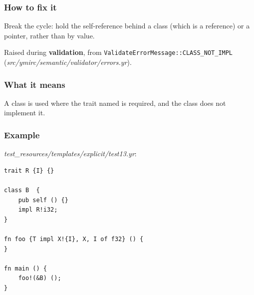 \subsubsection*{How to fix it}

Break the cycle: hold the self-reference behind a class (which is a reference) or a pointer, rather than by value.

\label{sec:codes:e4018}

Raised during \textbf{validation}, from \texttt{ValidateErrorMessage::\allowbreak{}CLASS\_\allowbreak{}NOT\_\allowbreak{}IMPL} (\textit{src/\allowbreak{}ymirc/\allowbreak{}semantic/\allowbreak{}validator/\allowbreak{}errors.yr}).

\subsubsection*{What it means}

A class is used where the trait named is required, and the class does not implement it.

\subsubsection*{Example}

\textit{test\_\allowbreak{}resources/\allowbreak{}templates/\allowbreak{}explicit/\allowbreak{}test13.yr}:

\begin{lstlisting}[style=coloredverbatimError]
trait R {I} {}

class B  {
    pub self () {}
    impl R!i32;
}

fn foo {T impl X!{I}, X, I of f32} () {
}

fn main () {
    foo!(&B) ();
}
\end{lstlisting}

